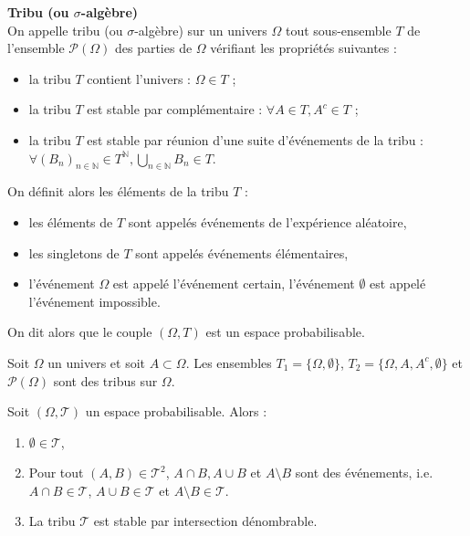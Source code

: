 \documentclass[../PolyS4.tex]{subfiles}
\begin{document}
\begin{Def}\textbf{Tribu (ou $\sigma$-algèbre)}\\

On appelle tribu (ou $\sigma$-algèbre) sur un univers $\Omega$ tout sous-ensemble $T$ de l'ensemble $\mathcal{P}(\Omega)$ des parties de $\Omega$ vérifiant les propriétés suivantes :
\begin{itemize}
    \item[(i)] la tribu $T$ contient l'univers : $\Omega \in T$ ;
    \item[(ii)] la tribu $T$ est stable par complémentaire : $\forall A \in T, A^c \in T$ ;
    \item[(iii)] la tribu $T$ est stable par réunion d'une suite d'événements de la tribu :
    $\forall (B_n)_{n \in \mathbb{N}} \in T^{\mathbb{N}}, \bigcup_{n \in \mathbb{N}} B_n \in T$.
\end{itemize}
On définit alors les éléments de la tribu $T$ :
\begin{itemize}
    \item les éléments de $T$ sont appelés événements de l'expérience aléatoire,
    \item les singletons de $T$ sont appelés événements élémentaires,
    \item l'événement $\Omega$ est appelé l'événement certain, l'événement $\emptyset$ est appelé l'événement impossible.
\end{itemize}
On dit alors que le couple $(\Omega, T)$ est un espace probabilisable.\\
\end{Def}


\begin{Ex}
Soit $\Omega$ un univers et soit $A \subset \Omega$. Les ensembles $T_1 = \{\Omega, \emptyset\}$, $T_2 = \{\Omega, A, A^c, \emptyset\}$ et $\mathcal{P}(\Omega)$ sont des tribus sur $\Omega$.

\end{Ex}


\begin{Prop}
Soit $(\Omega, \mathcal{T})$ un espace probabilisable. Alors :\\
\begin{enumerate}
    \item $\emptyset \in \mathcal{T}$,
    \item Pour tout $(A, B) \in \mathcal{T}^2$, $A \cap B, A \cup B$ et $A \setminus B$ sont des événements, i.e. $A \cap B \in \mathcal{T}$, $A \cup B \in \mathcal{T}$ et $A \setminus B \in \mathcal{T}$.
    \item La tribu $\mathcal{T}$ est stable par intersection dénombrable.\\
\end{enumerate}
\end{Prop}
\end{document}
